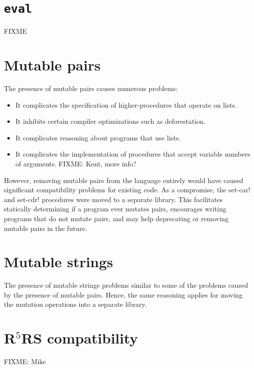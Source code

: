 \documentclass[twoside,twocolumn]{algol60}
\begin{document}
\chapter{{\tt eval}}

FIXME

\chapter{Mutable pairs}

The presence of mutable pairs causes numerous problems:
%
\begin{itemize}
\item It complicates the specification of higher-procedures that
  operate on lists.
\item It inhibits certain compiler optimizations such as
  deforestation.
\item It complicates reasoning about programs that use lists.
\item It complicates the implementation of procedures that accept
  variable numbers of arguments.  FIXME: Kent, more info?
\end{itemize}
%
However, removing mutable pairs from the language entirely would have
caused significant compatibility problems for existing code.  As a
compromise, the {\cf set-car!} and {\cf set-cdr!} procedures were
moved to a separate library.  This facilitates statically determining
if a program ever mutates pairs, encourages writing programs that do
not mutate pairs, and may help deprecating or removing mutable pairs
in the future.

\chapter{Mutable strings}

The presence of mutable strings problems similar to some of the
problems caused by the presence of mutable pairs.  Hence, the same
reasoning applies for moving the mutation operations into a separate
library.

\chapter{R$^5$RS compatibility}

FIXME: Mike


\renewcommand{\bibname}{References}




\vfill\eject


\newcommand{\indexheading}{Alphabetic index of definitions of
  concepts, keywords, and procedures}
\newcommand{\indexintro}{}

\printindex
\end{document}
